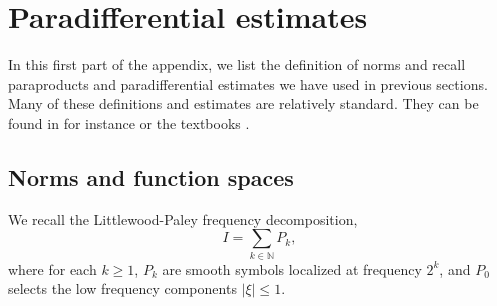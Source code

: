\documentclass[10pt]{amsart}
\theoremstyle{remark}
\theoremstyle{definition}
\numberwithin{equation}{section}
\begin{document}
\appendix

\section{Paradifferential estimates} \label{s:Norms}
In this first part of the appendix, we list the definition of norms and recall paraproducts and paradifferential estimates we have used in previous sections.
Many of these definitions and estimates are relatively standard.
They can be found in for instance \cite{MR2931520, MR3260858} or the textbooks \cite{MR2768550, MR2418072}.

\subsection{Norms and function spaces}
We recall the  Littlewood-Paley frequency decomposition,
\begin{equation*}
    I = \sum_{k\in \mathbb{N}} P_k, 
\end{equation*}
where for each $k\geq 1$, $P_k$ are smooth symbols  localized at  frequency $2^k$,  and $P_0$ selects the low frequency components $|\xi|\leq 1$.
\end{document}
